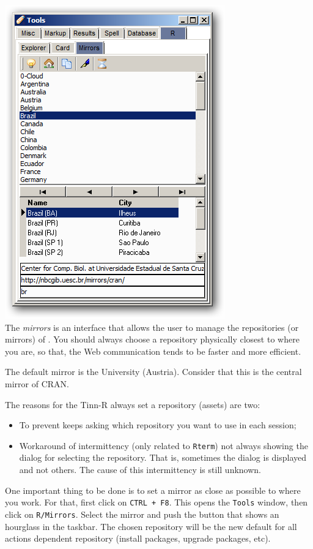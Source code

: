 \includegraphics[scale=0.50]{./res/tools_r_mirrors.png} \\

The \textit{mirrors} is an interface that allows the user to manage the repositories (or mirrors) of \RR{}.
You should always choose a repository physically closest to where you are,
so that, the Web communication tends to be faster and more efficient.

The default mirror is the University 
(Austria).
Consider that this is the central mirror of CRAN.

The reasons for the Tinn-R always set a repository (assets) are two:
\begin{itemize}
   \item To prevent \RR{} keeps asking which repository you want to use in each session;
   \item Workaround of intermittency (only related to \texttt{Rterm}) not always showing the dialog for selecting the repository.
    That is, sometimes the dialog is displayed and not others. The cause of this intermittency is still unknown.
\end{itemize}

One important thing to be done is to set a \RR{} mirror as close as possible to where you work.
For that, first click on \texttt{CTRL + F8}.
This opens the \texttt{Tools} window, then click on \texttt{R/Mirrors}.
Select the \RR{} mirror and push the button that shows an hourglass in the taskbar.
The chosen repository will be the new default for all actions dependent repository
(install packages, upgrade packages, etc).

